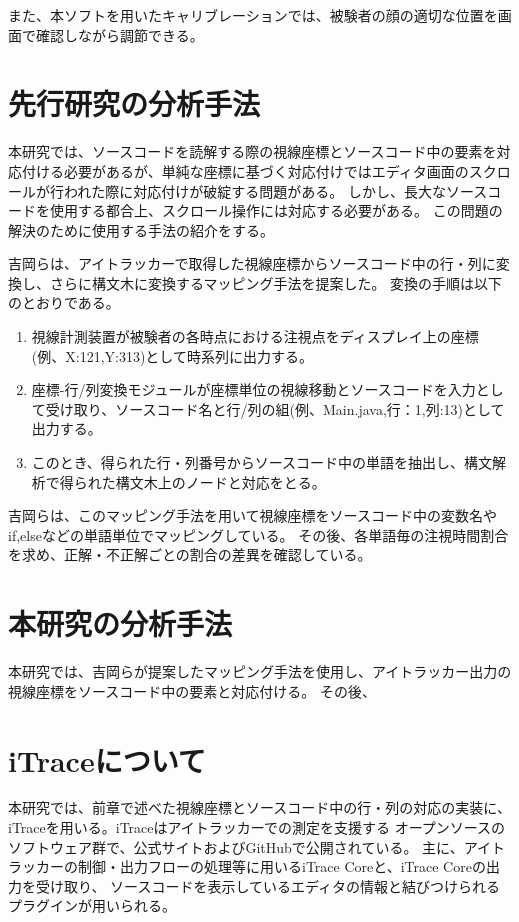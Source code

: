 \documentclass[paper=a4paper,fontsize=11pt]{jlreq}
\begin{document}
      また、本ソフトを用いたキャリブレーションでは、被験者の顔の適切な位置を画面で確認しながら調節できる。

  \section{先行研究の分析手法}
    本研究では、ソースコードを読解する際の視線座標とソースコード中の要素を対応付ける必要があるが、単純な座標に基づく対応付けではエディタ画面のスクロールが行われた際に対応付けが破綻する問題がある。
    しかし、長大なソースコードを使用する都合上、スクロール操作には対応する必要がある。
    この問題の解決のために使用する手法の紹介をする。

    吉岡らは、アイトラッカーで取得した視線座標からソースコード中の行・列に変換し、さらに構文木に変換するマッピング手法を提案した\cite{meiji2021}。
    変換の手順は以下のとおりである。
    \begin{enumerate}
      \item 視線計測装置が被験者の各時点における注視点をディスプレイ上の座標(例、X:121,Y:313)として時系列に出力する。
      \item 座標-行/列変換モジュールが座標単位の視線移動とソースコードを入力として受け取り、ソースコード名と行/列の組(例、Main.java,行：1,列:13)として出力する。
      \item このとき、得られた行・列番号からソースコード中の単語を抽出し、構文解析で得られた構文木上のノードと対応をとる。
    \end{enumerate}
    
    吉岡らは、このマッピング手法を用いて視線座標をソースコード中の変数名やif,elseなどの単語単位でマッピングしている。
    その後、各単語毎の注視時間割合を求め、正解・不正解ごとの割合の差異を確認している。
  \clearpage    

  \section{本研究の分析手法}
    本研究では、吉岡らが提案したマッピング手法を使用し、アイトラッカー出力の視線座標をソースコード中の要素と対応付ける。
    その後、

  \section{iTraceについて}
    本研究では、前章で述べた視線座標とソースコード中の行・列の対応の実装に、iTrace\cite{itrace}を用いる。iTraceはアイトラッカーでの測定を支援する
    オープンソースのソフトウェア群で、公式サイトおよびGitHubで公開されている。
    主に、アイトラッカーの制御・出力フローの処理等に用いるiTrace Coreと、iTrace Coreの出力を受け取り、
    ソースコードを表示しているエディタの情報と結びつけられるプラグインが用いられる。
\end{document}
